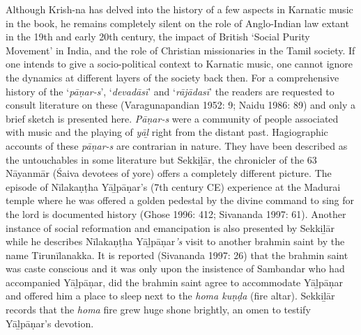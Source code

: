 {Although Krish-na has delved into the history of a few aspects in Karnatic music in the book, he remains completely silent on the role of Anglo-Indian law extant in the 19th and early 20th century, the impact of British ‘Social Purity Movement’ in India, and the role of Christian missionaries in the Tamil society. If one intends to give a socio-political context to Karnatic music, one cannot ignore the dynamics at different layers of the society back then. For a comprehensive history of the ‘\textit{pāṇar-s}’, ‘\textit{devadāsī}’ and ‘\textit{rājādasī}’ the readers are requested to consult literature on these (Varagunapandian 1952: 9; Naidu 1986: 89) and only a brief sketch is presented here. \textit{Pāṇar-s} were a community of people associated with music and the playing of \textit{yāḻ} right from the distant past. Hagiographic accounts of these \textit{pāṇar-s} are contrarian in nature. They have been described as the untouchables in some literature but Sekkiḻār, the chronicler of the 63 Nāyanmār (Śaiva devotees of yore) offers a completely different picture. The episode of Nīlakaṇṭha Yāḻpāṇar’s (7th century CE) experience at the Madurai temple where he was offered a golden pedestal by the divine command to sing for the lord is documented history (Ghose 1996: 412; Sivananda 1997: 61). Another instance of social reformation and emancipation is also presented by Sekkiḻār while he describes Nīlakaṇṭha Yāḻpāṇar\textit{’s} visit to another brahmin saint by the name Tirunīlanakka. It is reported (Sivananda 1997: 26) that the brahmin saint was caste conscious and it was only upon the insistence of Sambandar who had accompanied Yāḻpāṇar, did the brahmin saint agree to accommodate Yāḻpāṇar and offered him a place to sleep next to the \textit{homa kuṇḍa} (fire altar). Sekkiḻār records that the \textit{homa} fire grew huge shone brightly, an omen to testify Yāḻpāṇar’s devotion.

}
